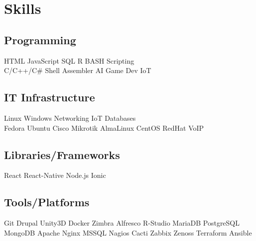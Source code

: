 \documentclass[]{plushcv}
\begin{document}
\hfill
\begin{minipage}[t]{0.25\textwidth} 


\section{Skills}
\subsection{Programming}
\sectionsep
{}
HTML \textbullet{} JavaScript \textbullet{} SQL \textbullet{} R \textbullet{} BASH Scripting \\
\sectionsep
{}
C/C++/C\# \textbullet{} Shell \textbullet{}  Assembler \textbullet{} AI \textbullet{} Game Dev \textbullet{} IoT \\
\sectionsep

\subsection{IT Infrastructure}
Linux \textbullet{} Windows \textbullet{} Networking \textbullet{} IoT \textbullet{} Databases \\
\sectionsep
{}
Fedora \textbullet{} Ubuntu \textbullet{} Cisco \textbullet{} Mikrotik \textbullet{} AlmaLinux \textbullet{} CentOS \textbullet{} RedHat \textbullet{} VoIP \\
\sectionsep


\subsection{Libraries/Frameworks}
\sectionsep
React \textbullet{} React-Native \textbullet{} Node.js \textbullet{} Ionic \\
\sectionsep
\sectionsep
\subsection{Tools/Platforms}
\sectionsep
Git \textbullet{} Drupal \textbullet{} Unity3D \textbullet{} Docker \textbullet{} Zimbra \textbullet{} Alfresco \textbullet{} R-Studio \textbullet{} MariaDB \textbullet{} PostgreSQL \textbullet{} MongoDB \textbullet{} Apache \textbullet{} Nginx \textbullet{} MSSQL \textbullet{} Nagios \textbullet{} Cacti \textbullet{} Zabbix \textbullet{} Zenoss \textbullet{} Terraform \textbullet{} Ansible \\


\end{minipage}
\end{document}
